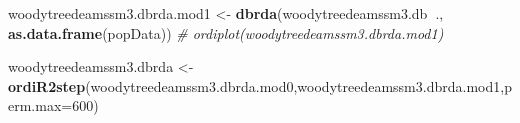 \documentclass[
]{article}
\newenvironment{Shaded}{\begin{snugshade}}{\end{snugshade}}
\newcommand{\CommentTok}[1]{\textcolor[rgb]{0.56,0.35,0.01}{\textit{#1}}}
\newcommand{\DataTypeTok}[1]{\textcolor[rgb]{0.13,0.29,0.53}{#1}}
\newcommand{\DecValTok}[1]{\textcolor[rgb]{0.00,0.00,0.81}{#1}}
\newcommand{\KeywordTok}[1]{\textcolor[rgb]{0.13,0.29,0.53}{\textbf{#1}}}
\newcommand{\NormalTok}[1]{#1}
\newcommand{\OperatorTok}[1]{\textcolor[rgb]{0.81,0.36,0.00}{\textbf{#1}}}
\newcommand{\StringTok}[1]{\textcolor[rgb]{0.31,0.60,0.02}{#1}}
\begin{document}
\begin{Shaded}
\begin{Highlighting}[]
\NormalTok{woodytreedeamssm3.dbrda.mod1 <-}\StringTok{ }\KeywordTok{dbrda}\NormalTok{(woodytreedeamssm3.db}\OperatorTok{~}\NormalTok{., }\KeywordTok{as.data.frame}\NormalTok{(popData))}
\CommentTok{# ordiplot(woodytreedeamssm3.dbrda.mod1)}
\end{Highlighting}
\end{Shaded}

\begin{Shaded}
\begin{Highlighting}[]
\NormalTok{woodytreedeamssm3.dbrda <-}\StringTok{ }\KeywordTok{ordiR2step}\NormalTok{(woodytreedeamssm3.dbrda.mod0,woodytreedeamssm3.dbrda.mod1,}\DataTypeTok{perm.max=}\DecValTok{600}\NormalTok{)}
\end{Highlighting}
\end{Shaded}
\end{document}
